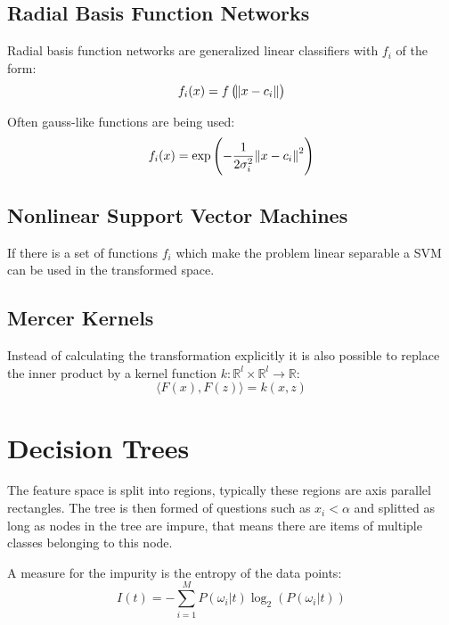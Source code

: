 \subsection{Radial Basis Function Networks}
Radial basis function networks are generalized linear classifiers with $f_i$ of the form:
\begin{equation*}
    f_i(x) = f\left(\norm{x-c_i}\right)
\end{equation*}

Often gauss-like functions are being used:
\begin{equation*}
    f_i(x) = \exp\left(-\frac{1}{2 \sigma_i^2} \norm{x-c_i}^2\right)
\end{equation*}

\subsection{Nonlinear Support Vector Machines}
If there is a set of functions $f_i$ which make the problem linear separable a SVM can be used in the transformed space.

\subsection{Mercer Kernels}
Instead of calculating the transformation explicitly it is also possible to replace the inner product by a kernel function $k: \mathbb{R}^l \times \mathbb{R}^l \to \mathbb{R}$:
\begin{equation*}
    \langle F(x), F(z) \rangle = k(x, z)
\end{equation*}

\section{Decision Trees}
The feature space is split into regions, typically these regions are axis parallel rectangles.
The tree is then formed of questions such as $x_i < \alpha$ and splitted as long as nodes in the tree are impure, that means there are items of multiple classes belonging to this node.

A measure for the impurity is the entropy of the data points:
\begin{equation*}
    I(t) = - \sum_{i=1}^M P(\omega_i | t) \log_2 \left(P(\omega_i | t)\right)
\end{equation*}

